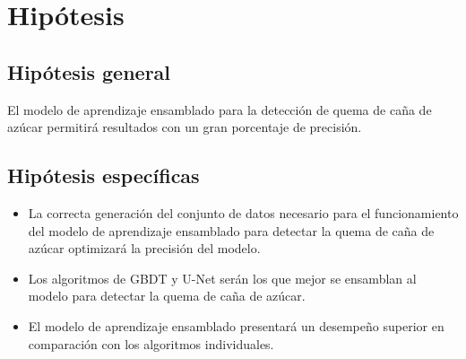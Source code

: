 \section{Hipótesis}
\subsection{Hipótesis general}
El modelo de aprendizaje ensamblado para la detección de quema de caña de azúcar permitirá resultados con un gran porcentaje de precisión.
\subsection{Hipótesis específicas}
\begin{itemize}
    \item La correcta generación del conjunto de datos necesario para el funcionamiento del modelo de aprendizaje ensamblado para detectar 
    la quema de caña de azúcar optimizará la precisión del modelo. 
    \item Los algoritmos de GBDT y U-Net serán los que mejor se ensamblan al modelo para detectar la quema de caña de azúcar.
    \item El modelo de aprendizaje ensamblado presentará un desempeño superior en comparación con los algoritmos individuales.
\end{itemize}